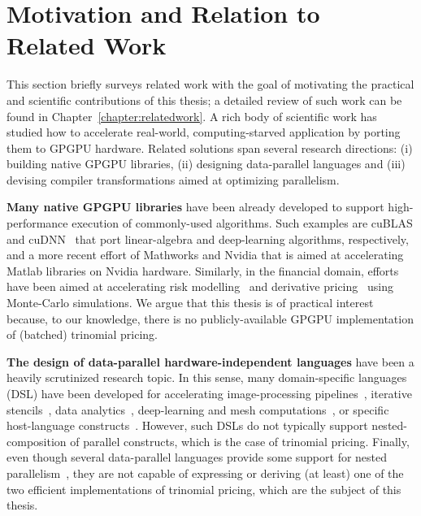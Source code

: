 \section{Motivation and Relation to Related Work}
\label{section:briefsurveyofrelatedsolutions}

This section briefly surveys related work with the goal of motivating the practical and scientific contributions of this thesis; a detailed review of such work can be found in Chapter~\ref{chapter:relatedwork}.
%
A rich body of scientific work has studied how to accelerate real-world, computing-starved application by porting them to GPGPU hardware. Related solutions span several research directions: (i) building native GPGPU libraries, (ii) designing data-parallel languages and (iii) devising compiler transformations aimed at optimizing parallelism.

{\bf Many native GPGPU libraries} have been already developed to support high-performance execution of commonly-used algorithms. Such examples are cuBLAS and cuDNN~\cite{cudnn} that port linear-algebra and deep-learning algorithms, respectively, and a more recent effort of Mathworks and Nvidia that is aimed at accelerating Matlab libraries on Nvidia hardware. Similarly, in the financial domain, efforts have been aimed at accelerating risk modelling~\cite{FinPar:TACO} and derivative pricing~\cite{LexiFiPricing} using Monte-Carlo simulations. We argue that this thesis is of practical interest because, to our knowledge, there is no publicly-available GPGPU implementation of (batched) trinomial pricing. 

{\bf The design of data-parallel hardware-independent languages} have been a heavily scrutinized research topic. In this sense, many domain-specific languages (DSL) have been developed for accelerating image-processing pipelines~\cite{Halide}, iterative stencils~\cite{tang2011pochoir}, data analytics~\cite{HPAT}, deep-learning and mesh computations~\cite{OP2-Mesh,DeliteDSLs}, or specific host-language constructs~\cite{Accelerate-ICFP,StreamJava8,svensson2011obsidian}. However, such DSLs do not typically support nested-composition of parallel constructs, which is the case of trinomial pricing. Finally, even though several data-parallel languages provide some support for nested parallelism~\cite{blelloch1994implementation,henriksen2017futhark}, they are not capable of expressing or deriving (at least) one of the two efficient implementations of trinomial pricing, which are the subject of this thesis.   


